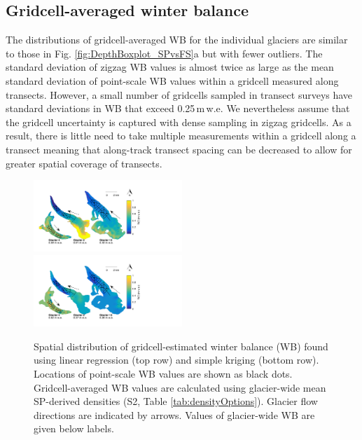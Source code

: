 \documentclass[twocolumn, letterpaper]{igs}
\begin{document}
\subsection{Gridcell-averaged winter balance}

The distributions of gridcell-averaged WB for the individual glaciers are similar to those in Fig. \ref{fig:DepthBoxplot_SPvsFS}a but with fewer outliers. The standard deviation of zigzag WB values is almost twice as large as the mean standard deviation of point-scale WB values within a gridcell measured along transects. However, a small number of gridcells sampled in transect surveys have standard deviations in WB that exceed 0.25\,m\,w.e. We nevertheless assume that the gridcell uncertainty is captured with dense sampling in zigzag gridcells. As a result, there is little need to take multiple measurements within a gridcell along a transect meaning that along-track transect spacing can be decreased to allow for greater spatial coverage of transects.


\begin{figure}
	\centering
	\includegraphics[width =0.5\textwidth]{LR_map.pdf}\\
    \includegraphics[width =0.5\textwidth]{SK_map.pdf}\\
	\caption{Spatial distribution of gridcell-estimated winter balance (WB) found using linear regression (top row) and simple kriging (bottom row). Locations of point-scale WB values are shown as black dots. Gridcell-averaged WB values are calculated using glacier-wide mean SP-derived densities (S2, Table \ref{tab:densityOptions}). Glacier flow directions are indicated by arrows. Values of glacier-wide WB are given below labels.}
	\label{fig:LR_SK_map}
\end{figure}
\end{document}
